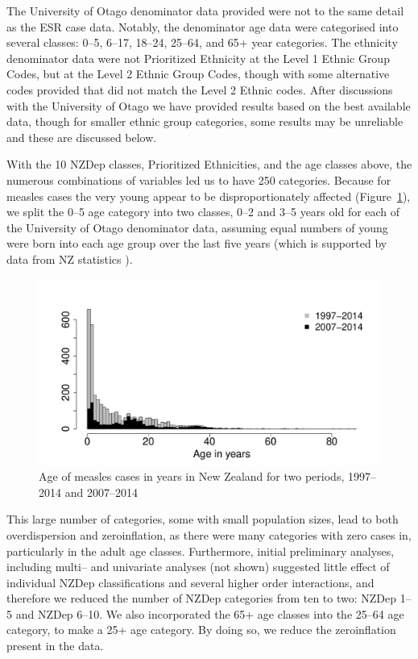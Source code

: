 \documentclass{article}
\begin{document}
The University of Otago denominator data provided were not to the same detail as the ESR case data. Notably, the denominator age data were categorised into several classes: 0--5, 6--17, 18--24, 25--64, and 65+ year categories. The ethnicity denominator data were not Prioritized Ethnicity at the Level 1 Ethnic Group Codes, but at the Level 2 Ethnic Group Codes, though with some alternative codes provided that did not match the Level 2 Ethnic codes. After discussions with the University of Otago we have provided results based on the best available data, though for smaller ethnic group categories, some results may be unreliable and these are discussed below.

With the 10 NZDep classes, Prioritized Ethnicities, and the age classes above, the numerous combinations of variables led us to have 250 categories. Because for measles cases the very young appear to be disproportionately affected (Figure~\ref{fig:ageinyears}), we split the 0--5 age category into two classes, 0--2 and 3--5 years old for each of the University of Otago denominator data, assuming equal numbers of young were born into each age group over the last five years (which is supported by data from NZ statistics \citep{stats14}).


\begin{figure}[h!]
\begin{center}
\includegraphics{draftfinalreport-015}
\end{center}
\caption{Age of measles cases in years in New Zealand for two periods, 1997--2014 and 2007--2014}
\label{fig:ageinyears}
\end{figure}





This large number of categories, some with small population sizes, lead to both overdispersion and zeroinflation, as there were many categories with zero cases in, particularly in the adult age classes. Furthermore, initial preliminary analyses, including multi-- and univariate analyses (not shown) suggested little effect of individual NZDep classifications and several higher order interactions, and therefore we reduced the number of NZDep categories from ten to two: NZDep 1--5 and NZDep 6--10. We also incorporated the 65+ age classes into the 25--64 age category, to make a 25+ age category. By doing so, we reduce the zeroinflation present in the data. 
\end{document}
